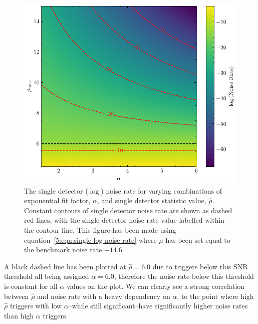 %
\begin{figure}
    \centering
    \includegraphics[width=1\textwidth]{images/5_pycbclive/high-noise-rate/lognoise_alpha_snr.pdf}
    \caption{The single detector ($\log$) noise rate for varying combinations of exponential fit factor, $\alpha$, and single detector statistic value, $\hat{\rho}$. Constant contours of single detector noise rate are shown as dashed red lines, with the single detector noise rate value labelled within the contour line. This figure has been made using equation~\ref{5:eqn:single-log-noise-rate} where $\mu$ has been set equal to the benchmark noise rate $-14.6$.}
    \label{5:fig:log-noise-static-rate}
\end{figure}
%
A black dashed line has been plotted at $\hat{\rho} = 6.0$ due to triggers below this SNR threshold all being assigned $\alpha = 6.0$, therefore the noise rate below this threshold is constant for all $\alpha$ values on the plot. We can clearly see a strong correlation between $\hat{\rho}$ and noise rate with a heavy dependency on $\alpha$, to the point where high $\hat{\rho}$ triggers with low $\alpha$--while still significant--have significantly higher noise rates than high $\alpha$ triggers.


